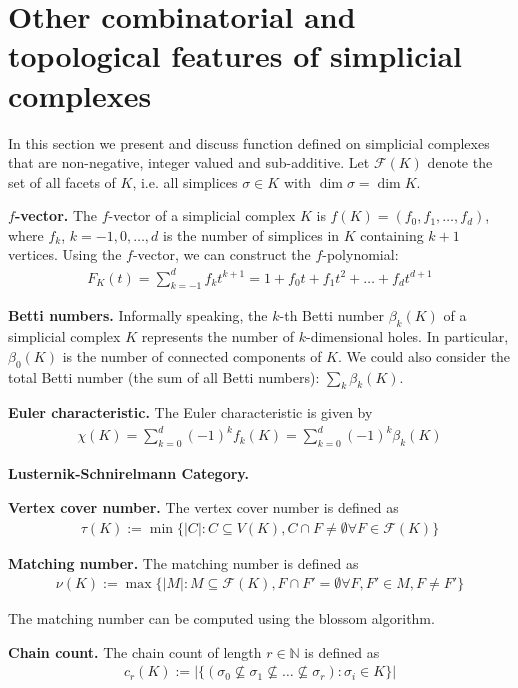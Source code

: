 \section{Other combinatorial and topological features of simplicial complexes}

In this section we present and discuss function defined on simplicial complexes that are non-negative, integer valued and sub-additive. Let $\mathcal{F}(K)$ denote the set of all facets of $K$, i.e. all simplices $\sigma\in K$ with $\dim\sigma=\dim K$.

\textbf{$f$-vector.} The $f$-vector of a simplicial complex $K$ is $f(K)=(f_0,f_1,\dots,f_d)$, where $f_k$, $k=-1,0,\dots,d$ is the number of simplices in $K$ containing $k+1$ vertices. Using the $f$-vector, we can construct the $f$-polynomial:
\begin{align*}
    F_K(t)=\sum_{k=-1}^{d}f_kt^{k+1}=1+f_0t+f_1t^2+\dots+f_dt^{d+1}
\end{align*}

\textbf{Betti numbers.} Informally speaking, the $k$-th Betti number $\beta_k(K)$ of a simplicial complex $K$ represents the number of $k$-dimensional holes. In particular, $\beta_0(K)$ is the number of connected components of $K$. We could also consider the total Betti number (the sum of all Betti numbers): $\sum_{k}\beta_k(K)$.

\textbf{Euler characteristic.} The Euler characteristic is given by
\begin{align*}
    \chi(K)=\sum_{k=0}^{d}(-1)^{k}f_k(K)=\sum_{k=0}^{d}(-1)^{k}\beta_k(K)
\end{align*}

\textbf{Lusternik-Schnirelmann Category.} 

\textbf{Vertex cover number.} The vertex cover number is defined as
\begin{align*}
    \tau(K):=\min\{|C|:C\subseteq V(K),C\cap F\ne\emptyset\forall F\in\mathcal{F}(K)\}
\end{align*}

\textbf{Matching number.} The matching number is defined as
\begin{align*}
    \nu(K):=\max\{|M|:M\subseteq\mathcal{F}(K),F\cap F'=\emptyset\forall F,F'\in M, F\ne F'\}
\end{align*}

The matching number can be computed using the blossom algorithm.

\textbf{Chain count.} The chain count of length $r\in\mathbb{N}$ is defined as
\begin{align*}
    c_r(K):=|\{(\sigma_0\nsubseteq\sigma_1\nsubseteq\dots\nsubseteq\sigma_r):\sigma_i\in K\}|
\end{align*}

